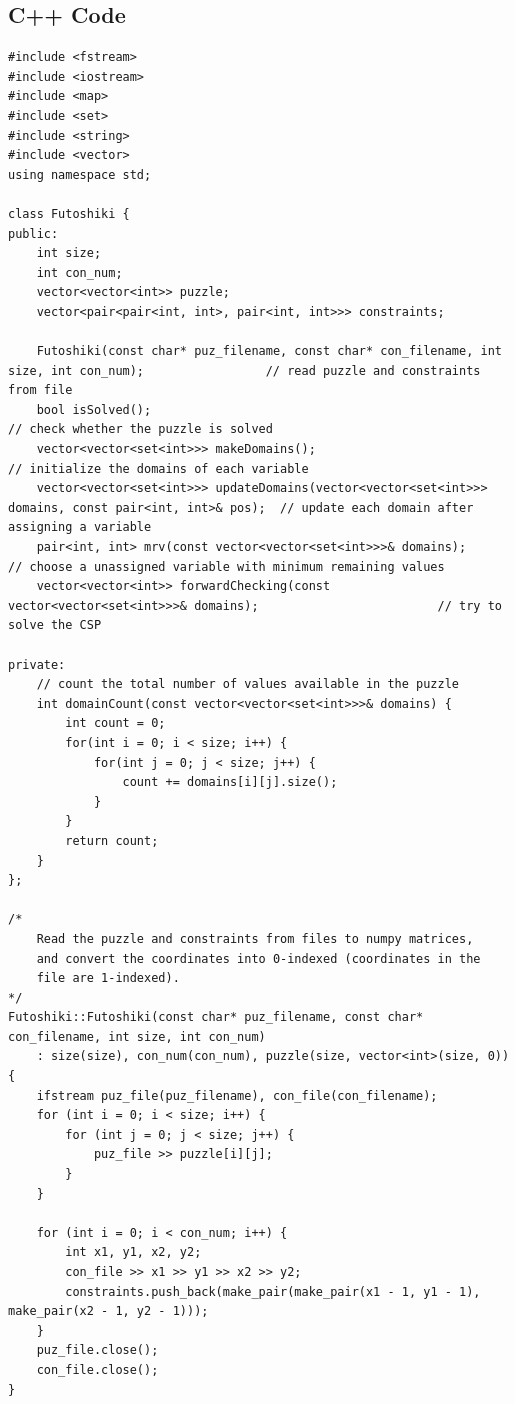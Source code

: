 \documentclass[a4paper, 11pt]{article}
\begin{document}
\subsection{C++ Code}
\begin{lstlisting}[title=cpp/forward_checking.cpp]
#include <fstream>
#include <iostream>
#include <map>
#include <set>
#include <string>
#include <vector>
using namespace std;

class Futoshiki {
public:
    int size;
    int con_num;
    vector<vector<int>> puzzle;
    vector<pair<pair<int, int>, pair<int, int>>> constraints;

    Futoshiki(const char* puz_filename, const char* con_filename, int size, int con_num);                 // read puzzle and constraints from file
    bool isSolved();                                                                                      // check whether the puzzle is solved
    vector<vector<set<int>>> makeDomains();                                                               // initialize the domains of each variable
    vector<vector<set<int>>> updateDomains(vector<vector<set<int>>> domains, const pair<int, int>& pos);  // update each domain after assigning a variable
    pair<int, int> mrv(const vector<vector<set<int>>>& domains);                                          // choose a unassigned variable with minimum remaining values
    vector<vector<int>> forwardChecking(const vector<vector<set<int>>>& domains);                         // try to solve the CSP

private:
    // count the total number of values available in the puzzle
    int domainCount(const vector<vector<set<int>>>& domains) {
        int count = 0;
        for(int i = 0; i < size; i++) {
            for(int j = 0; j < size; j++) {
                count += domains[i][j].size();
            }
        }
        return count;
    }
};

/*
    Read the puzzle and constraints from files to numpy matrices,
    and convert the coordinates into 0-indexed (coordinates in the
    file are 1-indexed).
*/
Futoshiki::Futoshiki(const char* puz_filename, const char* con_filename, int size, int con_num)
    : size(size), con_num(con_num), puzzle(size, vector<int>(size, 0)) {
    ifstream puz_file(puz_filename), con_file(con_filename);
    for (int i = 0; i < size; i++) {
        for (int j = 0; j < size; j++) {
            puz_file >> puzzle[i][j];
        }
    }

    for (int i = 0; i < con_num; i++) {
        int x1, y1, x2, y2;
        con_file >> x1 >> y1 >> x2 >> y2;
        constraints.push_back(make_pair(make_pair(x1 - 1, y1 - 1), make_pair(x2 - 1, y2 - 1)));
    }
    puz_file.close();
    con_file.close();
}


\end{lstlisting}
\end{document}
